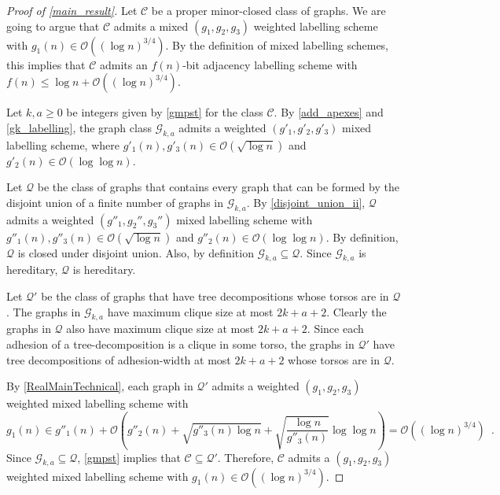 \documentclass{patmorin}
\renewcommand{\le}{\leqslant}
\renewcommand{\geq}{\geqslant}
\newcommand{\Oh}{\mathcal{O}}
\begin{document}
  \begin{proof}[Proof of \cref{main_result}]
     Let $\mathcal{C}$ be a proper minor-closed class of graphs.
     We are going to argue that $\mathcal{C}$ admits a mixed $(g_1,g_2,g_3)$ weighted labelling scheme with $g_1(n) \in \Oh((\log n)^{3/4})$. By the definition of mixed labelling schemes, this implies that $\mathcal{C}$ admits an $f(n)$-bit adjacency labelling scheme with $f(n)\le\log n + \Oh((\log n)^{3/4})$.

     Let $k,a\geq 0$ be integers given by \cref{gmpst} for the class $\mathcal{C}$.
     By \cref{add_apexes} and \cref{gk_labelling}, the graph class $\mathcal{G}_{k,a}$ admits a weighted $(g'_1,g'_2,g'_3)$ mixed labelling scheme, where $g'_1(n),g'_3(n)\in \Oh(\sqrt{\log n})$ and $g'_2(n)\in \Oh(\log\log n)$.

     Let $\mathcal{Q}$ be the class of graphs that contains every graph that can be formed by the disjoint union of a finite number of graphs in $\mathcal{G}_{k,a}$.  By \cref{disjoint_union_ii}, $\mathcal{Q}$ admits a weighted $(g''_1,g_2'',g_3'')$ mixed labelling scheme with $g''_1(n),g''_3(n)\in \Oh(\sqrt{\log n})$ and $g''_2(n)\in \Oh(\log\log n)$.   By definition, $\mathcal{Q}$ is closed under disjoint union.  Also, by definition $\mathcal{G}_{k,a}\subseteq\mathcal{Q}$. Since $\mathcal{G}_{k,a}$ is hereditary, $\mathcal{Q}$ is hereditary.

     Let $\mathcal{Q}'$ be the class of graphs that have tree decompositions whose torsos are in $\mathcal{Q}$.  The graphs in $\mathcal{G}_{k,a}$ have maximum clique size at most $2k+a+2$.  Clearly the graphs in $\mathcal{Q}$ also have maximum clique size at most $2k+a+2$. Since each adhesion of a tree-decomposition is a clique in some torso, the graphs in $\mathcal{Q}'$ have tree decompositions of adhesion-width at most $2k+a+2$ whose torsos are in $\mathcal{Q}$.

     By \cref{RealMainTechnical}, each graph in $\mathcal{Q}'$ admits a weighted $(g_1,g_2,g_3)$ weighted mixed labelling scheme with
     \[
       g_1(n) \in g''_1(n) + \Oh\left(g''_2(n) + \sqrt{g''_3(n)\log n}
       + \sqrt{\frac{\log n}{g''_3(n)}}\log\log n\right) = \Oh((\log n)^{3/4}) \enspace.
     \]
     Since $\mathcal{G}_{k,a}\subseteq\mathcal{Q}$, \cref{gmpst} implies that $\mathcal{C}\subseteq\mathcal{Q}'$.  Therefore, $\mathcal{C}$ admits a $(g_1,g_2,g_3)$ weighted mixed labelling scheme with $g_1(n)\in \Oh((\log n)^{3/4})$.
  \end{proof}
\end{document}
